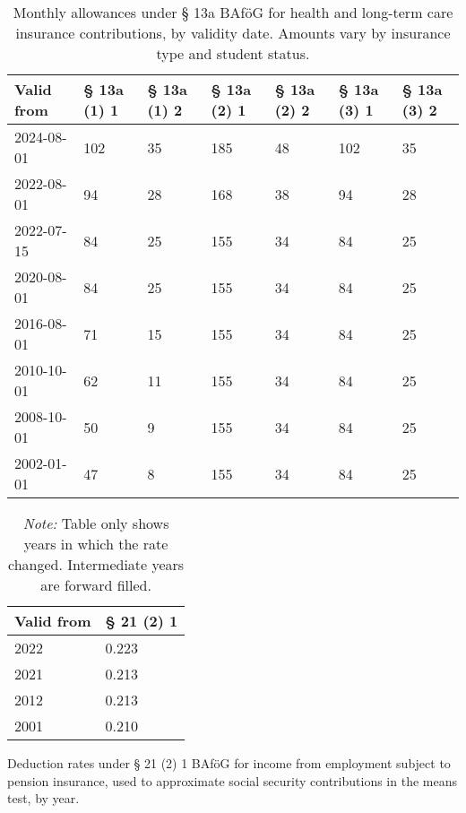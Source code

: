 \vspace{1em}

\begin{table}[H]
\centering
\small
\begin{tabularx}{\textwidth}{lXXXXXX}
\toprule
\textbf{Valid from} & \textbf{§ 13a (1) 1} & \textbf{§ 13a (1) 2} & \textbf{§ 13a (2) 1} & \textbf{§ 13a (2) 2} & \textbf{§ 13a (3) 1} & \textbf{§ 13a (3) 2} \\
\midrule
2024-08-01 & 102 & 35 & 185 & 48 & 102 & 35 \\
2022-08-01 & 94  & 28 & 168 & 38 & 94  & 28 \\
2022-07-15 & 84  & 25 & 155 & 34 & 84  & 25 \\
2020-08-01 & 84  & 25 & 155 & 34 & 84  & 25 \\
2016-08-01 & 71  & 15 & 155 & 34 & 84  & 25 \\
2010-10-01 & 62  & 11 & 155 & 34 & 84  & 25 \\
2008-10-01 & 50  & 9  & 155 & 34 & 84  & 25 \\
2002-01-01 & 47  & 8  & 155 & 34 & 84  & 25 \\
\bottomrule
\end{tabularx}
\caption{Monthly allowances under § 13a BAföG for health and long-term care insurance contributions, by validity date. Amounts vary by insurance type and student status.}
\label{tab:bafog_values_13a}
\end{table}

\vspace{1em}

\begin{table}[H]
\centering
\small
\begin{tabularx}{\textwidth}{lX}
\toprule
\textbf{Valid from} & \textbf{§ 21 (2) 1} \\
\midrule
2022 & 0.223 \\
2021 & 0.213 \\
2012 & 0.213 \\
2001 & 0.210 \\
\bottomrule
\end{tabularx}
\caption{Deduction rates under § 21 (2) 1 BAföG for income from employment subject to pension insurance, used to approximate social security contributions in the means test, by year.}
\caption*{\textit{Note:} Table only shows years in which the rate changed. Intermediate years are forward filled.}
\label{tab:bafog_rates}
\end{table}

\vspace{1em}

